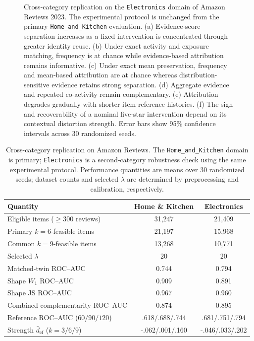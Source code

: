 \begin{figure}[t]
    \caption{
    Cross-category replication on the \texttt{Electronics} domain of
    Amazon Reviews 2023. The experimental protocol is unchanged from the
    primary \texttt{Home\_and\_Kitchen} evaluation.
    (a) Evidence-score separation increases as a fixed intervention is
    concentrated through greater identity reuse.
    (b) Under exact activity and exposure matching, frequency is at chance
    while evidence-based attribution remains informative.
    (c) Under exact mean preservation, frequency and mean-based attribution
    are at chance whereas distribution-sensitive evidence retains strong
    separation.
    (d) Aggregate evidence and repeated co-activity remain complementary.
    (e) Attribution degrades gradually with shorter item-reference histories.
    (f) The sign and recoverability of a nominal five-star intervention depend
    on its contextual distortion strength.
    Error bars show 95\% confidence intervals across 30 randomized seeds.
    }
    \label{fig:supp-electronics}
\end{figure}

\begin{table}[t]
\centering
\caption{Cross-category replication on Amazon Reviews.
The \texttt{Home\_and\_Kitchen} domain is primary; \texttt{Electronics}
is a second-category robustness check using the same experimental protocol.
Performance quantities are means over 30 randomized seeds; dataset counts
and selected $\lambda$ are determined by preprocessing and calibration,
respectively.}
\label{tab:supp-electronics}
\small
\begin{tabular}{lcc}
\toprule
Quantity & Home \& Kitchen & Electronics \\
\midrule
Eligible items ($\ge 300$ reviews)
    & 31,247 & 21,409 \\
Primary $k=6$-feasible items
    & 21,197 & 15,968 \\
Common $k=9$-feasible items
    & 13,268 & 10,771 \\
Selected $\lambda$
    & 20 & 20 \\
Matched-twin ROC--AUC
    & 0.744 & 0.794 \\
Shape $W_1$ ROC--AUC
    & 0.909 & 0.891 \\
Shape JS ROC--AUC
    & 0.967 & 0.960 \\
Combined complementarity ROC--AUC
    & 0.874 & 0.895 \\
Reference ROC--AUC ($60/90/120$)
    & .618/.688/.744 & .681/.751/.794 \\
Strength $\bar d_{\mathrm{cf}}$ ($k=3/6/9$)
    & -.062/.001/.160 & -.046/.033/.202 \\
\bottomrule
\end{tabular}
\end{table}



